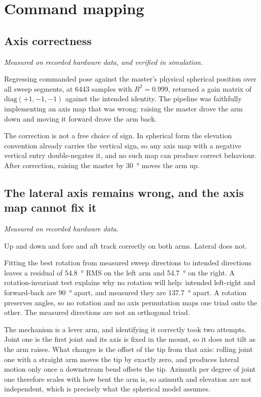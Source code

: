 \section{Command mapping}

\subsection{Axis correctness}

\emph{Measured on recorded hardware data, and verified in simulation.}

Regressing commanded pose against the master's physical spherical position
over all sweep segments, at \num{6443} samples with $R^2 = \num{0.999}$,
returned a gain matrix of $\mathrm{diag}(+1, -1, -1)$ against the intended
identity. The pipeline was faithfully implementing an axis map that was wrong:
raising the master drove the arm down and moving it forward drove the arm
back.

The correction is not a free choice of sign. In spherical form the elevation
convention already carries the vertical sign, so any axis map with a negative
vertical entry double-negates it, and no such map can produce correct
behaviour. After correction, raising the master by \SI{30}{\degree} moves the
arm up.

\subsection{The lateral axis remains wrong, and the axis map cannot fix it}

\emph{Measured on recorded hardware data.}

Up and down and fore and aft track correctly on both arms. Lateral does not.

Fitting the best rotation from measured sweep directions to intended
directions leaves a residual of \SI{54.8}{\degree} RMS on the left arm and
\SI{54.7}{\degree} on the right. A rotation-invariant test explains why no
rotation will help: intended left-right and forward-back are
\SI{90}{\degree} apart, and measured they are \SI{137.7}{\degree} apart. A
rotation preserves angles, so no rotation and no axis permutation maps one
triad onto the other. The measured directions are not an orthogonal triad.

The mechanism is a lever arm, and identifying it correctly took two attempts.
Joint one is the first joint and its axis is fixed in the mount, so it does
not tilt as the arm raises. What changes is the offset of the tip from that
axis: rolling joint one with a straight arm moves the tip by exactly zero, and
produces lateral motion only once a downstream bend offsets the tip. Azimuth
per degree of joint one therefore scales with how bent the arm is, so azimuth
and elevation are not independent, which is precisely what the spherical model
assumes.

